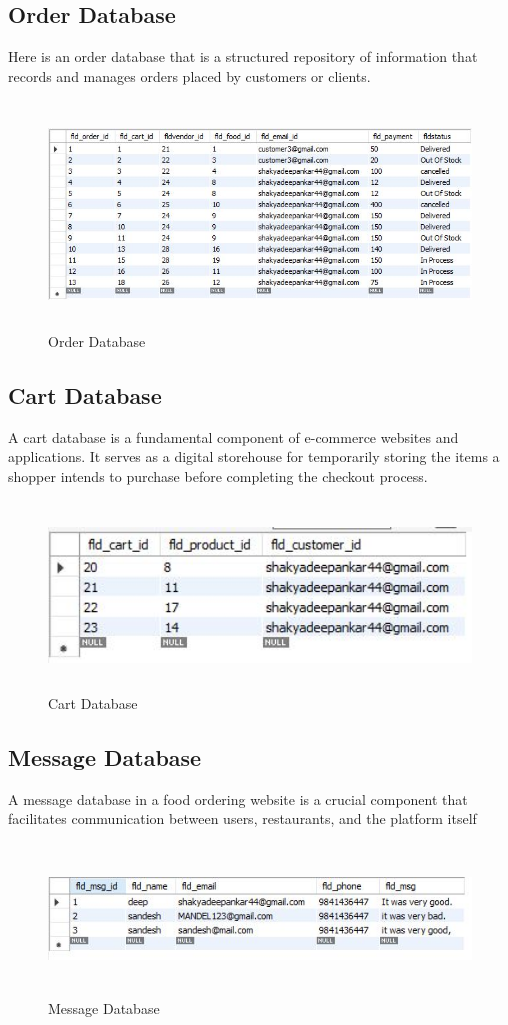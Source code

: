 \subsection{Order Database}
Here is an order database that is a structured repository of information that records and manages orders placed by customers or clients. 
\begin{figure}[h]
    \centering
    \includegraphics[height=6cm]{img/Graphics/orderDB.JPG}
    \caption{Order Database}
\end{figure}

\subsection{Cart Database}
A cart database is a fundamental component of e-commerce websites and applications. It serves as a digital storehouse for temporarily storing the items a shopper intends to purchase before completing the checkout process. 
\begin{figure}[h]
    \centering
    \includegraphics[width=15cm, height=5cm]{img/Graphics/cartDB.JPG}
    \caption{Cart Database}
\end{figure}

\newpage
\subsection{Message Database}
A message database in a food ordering website is a crucial component that facilitates communication between users, restaurants, and the platform itself
\begin{figure}[h]
    \centering
    \includegraphics[width=15cm, height=4cm]{img/Graphics/messageDB.JPG}
    \caption{Message Database}
\end{figure}

